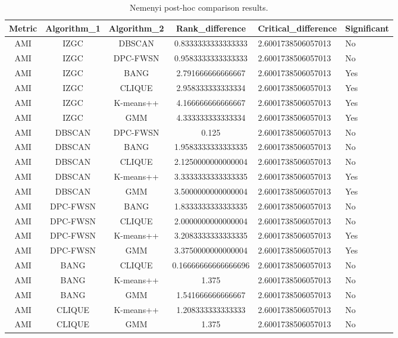 
\begin{table}[ht]
\centering
\caption{
Nemenyi post-hoc comparison results.
}
\label{
tab:S3_nemenyi
}

\begin{tabular}{cccc}
\toprule
Metric & Algorithm_1 & Algorithm_2 & Rank_difference & Critical_difference & Significant\\

\midrule
AMI & IZGC & DBSCAN & 0.8333333333333333 & 2.6001738506057013 & No\\
AMI & IZGC & DPC-FWSN & 0.9583333333333333 & 2.6001738506057013 & No\\
AMI & IZGC & BANG & 2.791666666666667 & 2.6001738506057013 & Yes\\
AMI & IZGC & CLIQUE & 2.958333333333334 & 2.6001738506057013 & Yes\\
AMI & IZGC & K-means++ & 4.166666666666667 & 2.6001738506057013 & Yes\\
AMI & IZGC & GMM & 4.333333333333334 & 2.6001738506057013 & Yes\\
AMI & DBSCAN & DPC-FWSN & 0.125 & 2.6001738506057013 & No\\
AMI & DBSCAN & BANG & 1.9583333333333335 & 2.6001738506057013 & No\\
AMI & DBSCAN & CLIQUE & 2.1250000000000004 & 2.6001738506057013 & No\\
AMI & DBSCAN & K-means++ & 3.3333333333333335 & 2.6001738506057013 & Yes\\
AMI & DBSCAN & GMM & 3.5000000000000004 & 2.6001738506057013 & Yes\\
AMI & DPC-FWSN & BANG & 1.8333333333333335 & 2.6001738506057013 & No\\
AMI & DPC-FWSN & CLIQUE & 2.0000000000000004 & 2.6001738506057013 & No\\
AMI & DPC-FWSN & K-means++ & 3.2083333333333335 & 2.6001738506057013 & Yes\\
AMI & DPC-FWSN & GMM & 3.3750000000000004 & 2.6001738506057013 & Yes\\
AMI & BANG & CLIQUE & 0.16666666666666696 & 2.6001738506057013 & No\\
AMI & BANG & K-means++ & 1.375 & 2.6001738506057013 & No\\
AMI & BANG & GMM & 1.541666666666667 & 2.6001738506057013 & No\\
AMI & CLIQUE & K-means++ & 1.208333333333333 & 2.6001738506057013 & No\\
AMI & CLIQUE & GMM & 1.375 & 2.6001738506057013 & No\\

\end{tabular}
\end{table}
